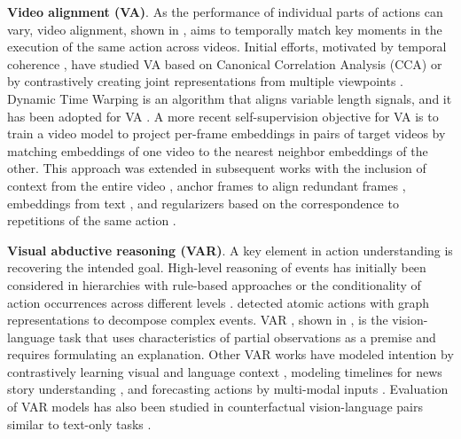 \noindent
\textbf{Video alignment (VA)}. As the performance of individual parts of actions can vary, video alignment, shown in , aims to temporally match key moments in the execution of the same action across videos. Initial efforts, motivated by temporal coherence \citep{goroshin2015unsupervised,fernando2017self,zhang2023modeling}, have studied VA based on Canonical Correlation Analysis (CCA) \citep{andrew2013deep} or by contrastively creating joint representations from multiple viewpoints \citep{sermanet2018time}. Dynamic Time Warping \citep{sakoe1978dynamic} is an algorithm that aligns variable length signals, and it has been adopted for VA \citep{chang2019d3tw,dvornik2021drop,hadji2021representation}. A more recent self-supervision objective \citep{dwibedi2018temporal} for VA is to train a video model to project per-frame embeddings in pairs of target videos by matching embeddings of one video to the nearest neighbor embeddings of the other. This approach was extended in subsequent works with the inclusion of context from the entire video \citep{haresh2021learning}, anchor frames to align redundant frames \citep{liu2022learning}, embeddings from text \citep{epstein2021learning}, and regularizers based on the correspondence to repetitions of the same action \citep{donahue2024learning}.


\noindent
\textbf{Visual abductive reasoning (VAR)}. A key element in action understanding is recovering the intended goal. High-level reasoning of events has initially been considered in hierarchies with rule-based approaches \citep{hakeem2004ontology} or the conditionality of action occurrences across different levels \citep{albanese2010pads}. \citet{pei2011parsing} detected atomic actions with graph representations to decompose complex events. VAR \citep{liang2022visual}, shown in , is the vision-language task that uses characteristics of partial observations as a premise and requires formulating an explanation. Other VAR works have modeled intention by contrastively learning visual and language context \citep{li2023intentqa}, modeling timelines for news story understanding \citep{liu2023video}, and forecasting actions by multi-modal inputs \citep{zhu2023personality}. Evaluation of VAR models has also been studied in counterfactual vision-language pairs \citep{park2022exposing} similar to text-only tasks \citep{ippolito2019unsupervised,huang2020inset}.


